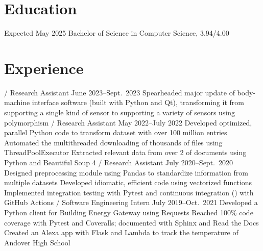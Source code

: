 \section{Education}
\begin{outline}
    \hfill Expected May 2025
        \1 Bachelor of Science in Computer Science,  3.94/4.00
\end{outline}

\section{Experience}
\begin{outline}
     / Research Assistant
    \hfill June 2023--Sept.\ 2023
        \1 Spearheaded major update of body-machine interface software (built with Python and Qt),
        transforming it from supporting a single kind of sensor to supporting a variety of sensors using polymorphism
     / Research Assistant
    \hfill May 2022--July 2022
        \1 Developed optimized, parallel Python code to transform dataset with over 100 million entries
        \1 Automated the multithreaded downloading of thousands of files using ThreadPoolExecutor
        \1 Extracted relevant data from over 2  of   documents using Python and Beautiful Soup 4
     / Research Assistant
    \hfill July 2020--Sept.\ 2020
        \1 Designed preprocessing module using Pandas to standardize information from multiple datasets
            \2 Developed idiomatic, efficient code using vectorized functions
            \2 Implemented integration testing with Pytest and continuous integration () with GitHub Actions
     / Software Engineering Intern
    \hfill July 2019--Oct.\ 2021
        \1 Developed a Python client for Building Energy Gateway using Requests
            \2 Reached 100\% code coverage with Pytest and Coveralls; documented  with Sphinx and Read the Docs
        \1 Created an Alexa app with Flask and  Lambda to track the temperature of Andover High School
\end{outline}

